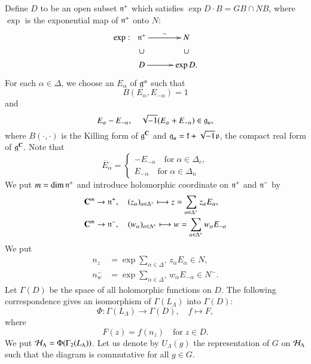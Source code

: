 \noindent
Define $D$ to be an open subset $\mathfrak{n}^{+}$ which satisfies $\exp D \cdot B=GB \cap N B$, where $\exp$ is the exponential map of $\mathfrak{n}^{+}$ onto $N$:
$$
\xymatrix@R=.1cm@C=.1cm{
\exp:  &  \fn^{+} \ar[rrrr]^-{\sim} &&&& N\\
       & \cup  &&&& \cup\\
       & D\ar[rrrr] &&&& \exp D.
      }
$$
For each $\alpha \in \Delta$, we choose an $E_{\alpha}$ of $\mathfrak{g}^{\alpha}$ such that
$$
B(E_{\alpha}, E_{-\alpha})=1
$$
and
$$
E_{\alpha}-E_{-\alpha}, \quad \sqrt{-1}(E_{\alpha} + E_{-\alpha}) \in \mathfrak{g}_{u},
$$
where $B(\cdot, \cdot)$ is the Killing form of $\mathfrak{g}^{\mathbf{C}}$ and $\mathfrak{g}_{u}= \mathfrak{k} + \sqrt{-1}\mathfrak{p}$, the compact real form of $\mathfrak{g}^{\mathbf{C}}$. Note that
$$
\overline{E}_{\alpha}= \left\{\begin{matrix}
-E_{-\alpha} \quad \text{for}\; \alpha \in \Delta_{c},\\
E_{-\alpha}\quad \text{for}\; \alpha \in \Delta_{n}
\end{matrix}
\right.
$$
We put $m=\dim \mathfrak{n}^{+}$ and introduce holomorphic coordinate on $\mathfrak{n}^{+}$ and $\mathfrak{n}^{-}$ by
\begin{align*}
&\mathbf{C}^{m} \rightarrow \mathfrak{n}^{+},\quad (z_{\alpha})_{\alpha \in \Delta^{+}} \longmapsto z = \sum\limits_{\alpha \in \Delta^{+}}z_{\alpha}E_{\alpha},\\
&\mathbf{C}^{m} \rightarrow \mathfrak{n}^{-},\quad (w_{\alpha})_{\alpha \in \Delta^{+}} \longmapsto w = \sum\limits_{\alpha \in \Delta^{+}}w_{\alpha}E_{-\alpha}
\end{align*}
We put
\begin{align*}
n_{z} &= \exp \sum\limits_{\alpha \in \Delta^{+}} z_{\alpha}E_{\alpha} \in N,\\
n_{w}^{-}&= \exp \sum\limits_{\alpha \in \Delta^{+}} w_{\alpha}E_{-\alpha} \in N^{-}.
\end{align*}
Let $\Gamma(D)$ be the space of all holomorphic functions on $D$. The following correspondence gives an isomorphism of $\Gamma(L_{\Lambda})$ into $\Gamma(D)$:
$$
\Phi : \Gamma(L_{\Lambda}) \longrightarrow \Gamma(D), \quad f \longmapsto F,
$$
where
$$
F(z)=f(n_{z}) \quad \text{for} \; z \in D.
$$
We put $\mathcal{H}_{\Lambda}= \Phi(\Gamma_{2}(L_{\Lambda}))$. Let us denote by $U_{\Lambda}(g)$ the representation of $G$ on $\mathcal{H}_{\Lambda}$ such that the diagram
is commutative for all $g \in G$.

